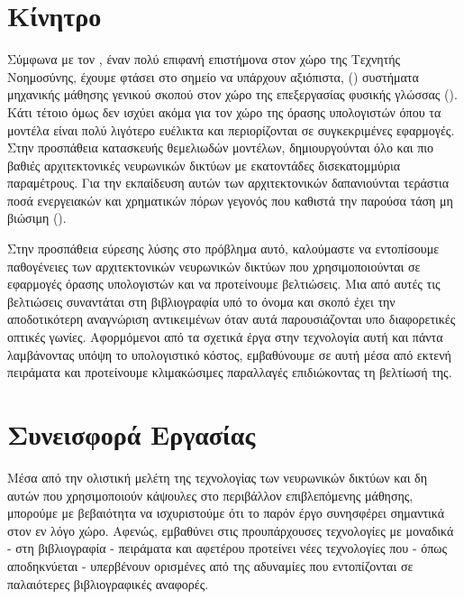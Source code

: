 \section{Κίνητρο}
Σύμφωνα με τον , έναν πολύ επιφανή επιστήμονα στον χώρο της Τεχνητής Νοημοσύνης, έχουμε φτάσει στο σημείο να υπάρχουν αξιόπιστα,  () συστήματα μηχανικής μάθησης γενικού σκοπού στον χώρο της επεξεργασίας φυσικής γλώσσας (). Κάτι τέτοιο όμως δεν ισχύει ακόμα για τον χώρο της όρασης υπολογιστών όπου τα μοντέλα είναι πολύ λιγότερο ευέλικτα και περιορίζονται σε συγκεκριμένες εφαρμογές\cite{anadiotis_2022}. Στην προσπάθεια κατασκευής θεμελιωδών μοντέλων, δημιουργούνται όλο και πιο βαθιές αρχιτεκτονικές νευρωνικών δικτύων με εκατοντάδες δισεκατομμύρια παραμέτρους. Για την εκπαίδευση αυτών των αρχιτεκτονικών δαπανιούνται τεράστια ποσά ενεργειακών και χρηματικών πόρων γεγονός που καθιστά την παρούσα τάση μη βιώσιμη ().\par 
Στην προσπάθεια εύρεσης λύσης στο πρόβλημα αυτό, καλούμαστε να εντοπίσουμε παθογένειες των αρχιτεκτονικών νευρωνικών δικτύων που χρησιμοποιούνται σε εφαρμογές όρασης υπολογιστών και να προτείνουμε βελτιώσεις. Μια από αυτές τις βελτιώσεις συναντάται στη βιβλιογραφία υπό το όνομα  και σκοπό έχει την αποδοτικότερη αναγνώριση αντικειμένων όταν αυτά παρουσιάζονται υπο διαφορετικές οπτικές γωνίες. Αφορμόμενοι από τα σχετικά έργα στην τεχνολογία αυτή και πάντα λαμβάνοντας υπόψη το υπολογιστικό κόστος, εμβαθύνουμε σε αυτή μέσα από εκτενή πειράματα και προτείνουμε κλιμακώσιμες παραλλαγές επιδιώκοντας τη βελτίωσή της.

\section{Συνεισφορά Εργασίας}
Μέσα από την ολιστική μελέτη της τεχνολογίας των νευρωνικών δικτύων και δη αυτών που χρησιμοποιούν κάψουλες στο περιβάλλον επιβλεπόμενης μάθησης, μπορούμε με βεβαιότητα να ισχυριστούμε ότι το παρόν έργο συνησφέρει σημαντικά στον εν λόγο χώρο. Αφενώς, εμβαθύνει στις προυπάρχουσες τεχνολογίες με μοναδικά - στη βιβλιογραφία - πειράματα και αφετέρου προτείνει νέες τεχνολογίες που - όπως αποδηκνύεται - υπερβένουν ορισμένες από της αδυναμίες που εντοπίζονται σε παλαιότερες βιβλιογραφικές αναφορές.\par

